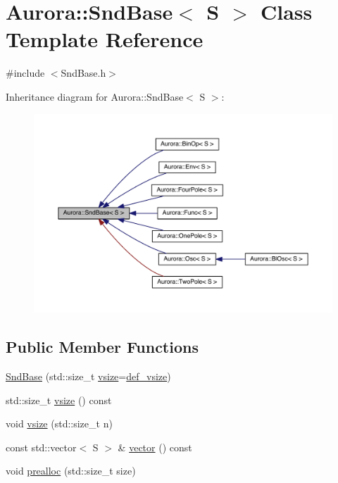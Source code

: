 \hypertarget{class_aurora_1_1_snd_base}{}\section{Aurora\+:\+:Snd\+Base$<$ S $>$ Class Template Reference}
\label{class_aurora_1_1_snd_base}


{\ttfamily \#include $<$Snd\+Base.\+h$>$}



Inheritance diagram for Aurora\+:\+:Snd\+Base$<$ S $>$\+:
\nopagebreak
\begin{figure}[H]
\begin{center}
\leavevmode
\includegraphics[width=350pt]{class_aurora_1_1_snd_base__inherit__graph}
\end{center}
\end{figure}
\subsection*{Public Member Functions}
\begin{DoxyCompactItemize}
\item 
\hyperlink{class_aurora_1_1_snd_base_a960739d3ae63df581c28f8801e589a3c}{Snd\+Base} (std\+::size\+\_\+t \hyperlink{class_aurora_1_1_snd_base_af9e21aaf411b17f7a8221c991ce5d291}{vsize}=\hyperlink{namespace_aurora_afaaddf667a06e7ce23c667a8b7295263}{def\+\_\+vsize})
\item 
std\+::size\+\_\+t \hyperlink{class_aurora_1_1_snd_base_af9e21aaf411b17f7a8221c991ce5d291}{vsize} () const
\item 
void \hyperlink{class_aurora_1_1_snd_base_a88dacba995eef179f2fc97e11a331913}{vsize} (std\+::size\+\_\+t n)
\item 
const std\+::vector$<$ S $>$ \& \hyperlink{class_aurora_1_1_snd_base_acf9171085003208901e23c1f50520345}{vector} () const
\item 
void \hyperlink{class_aurora_1_1_snd_base_a5d57c3b735e5d583b4b4ae5f8e9cdf4c}{prealloc} (std\+::size\+\_\+t size)
\end{DoxyCompactItemize}
